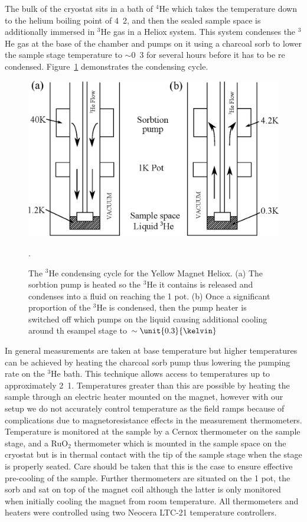 The bulk of the cryostat sits in a bath of $^4$He which takes the temperature down to the helium boiling point of \unit{4.2}{\kelvin}, and then the sealed sample space is additionally immersed in $^3$He gas in a Heliox system. This system condenses the $^3$He gas at the base of the chamber and pumps on it using a charcoal sorb to lower the sample stage temperature to $\sim$\unit{0.3}{\kelvin} for several hours before it has to be re condensed. Figure~\ref{Fig:Exp:YellowFridge} demonstrates the condensing cycle.
\begin{figure}[htbp]
    \begin{center}
        \includegraphics[scale=0.6]{Chapter-ExperimentalTechnique/Figures/YellowFridge/YellowFridge}
        \caption{The $^3$He condensing cycle for the Yellow Magnet Heliox. (a) The sorbtion pump is heated so the $^3$He it contains is released and condenses into a fluid on reaching the \unit{1}{\kelvin} pot. (b) Once a significant proportion of the $^3$He is condensed, then the pump heater is switched off which pumps on the liquid causing additional cooling around th esampel stage to $\sim\unit{0.3}{\kelvin}$}.
        \label{Fig:Exp:YellowFridge}
    \end{center}
\end{figure}
 In general measurements are taken at base temperature but higher temperatures can be achieved by heating the charcoal sorb pump thus lowering the pumping rate on the $^3$He bath. This technique allows access to temperatures up to approximately \unit{2.1}{\kelvin}. Temperatures greater than this are possible by heating the sample through an electric heater mounted on the magnet, however with our setup we do not accurately control temperature as the field ramps because of complications due to magnetoresistance effects in the measurement thermometers. Temperature is monitored at the sample by a Cernox thermometer on the sample stage, and a RuO$_2$ thermometer which is mounted in the sample space on the cryostat but is in thermal contact with the tip of the sample stage when the stage is properly seated. Care should be taken that this is the case to ensure effective pre-cooling of the sample. Further thermometers are situated on the \unit{1}{\kelvin} pot, the sorb and sat on top of the magnet coil although the latter is only monitored when initially cooling the magnet from room temperature. All thermometers and heaters were controlled using two Neocera LTC-21 temperature controllers.

